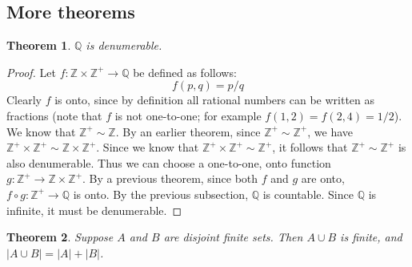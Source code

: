 \documentclass{report}
\newtheorem*{theorem}{Theorem}
\theoremstyle{definition}
\begin{document}
\subsection{More theorems}
\begin{theorem}
$\mathbb Q$ is denumerable.
\end{theorem}
\begin{proof}
Let $f:\mathbb Z\times\mathbb Z^+\to\mathbb Q$ be defined as follows:
\begin{equation*}
f(p,q)=p/q
\end{equation*}
Clearly $f$ is onto, since by definition all rational numbers can be written as fractions (note that $f$ is not one-to-one; for example $f(1,2)=f(2,4)=1/2$).
We know that $\mathbb Z^+\sim\mathbb Z$. By an earlier theorem, since $\mathbb Z^+\sim\mathbb Z^+$, we have $\mathbb Z^+\times\mathbb Z^+\sim\mathbb Z\times\mathbb Z^+$. Since we know that
$\mathbb Z^+\times\mathbb Z^+\sim\mathbb Z^+$, it follows that $\mathbb Z^+\sim\mathbb Z^+$ is also denumerable. Thus we can choose a one-to-one, onto function $g:\mathbb Z^+\to\mathbb Z\times\mathbb Z^+$. By a previous theorem, since both $f$ and $g$ are onto, $f\circ g:\mathbb Z^+\to\mathbb Q$ 
is onto. By the previous subsection, $\mathbb Q$ is countable. Since $\mathbb Q$ is infinite, it must be denumerable.
\end{proof}
\begin{theorem}
Suppose $A$ and $B$ are disjoint finite sets. Then $A\cup B$ is finite, and $|A\cup B|=|A|+|B|$.
\end{theorem}
\end{document}
